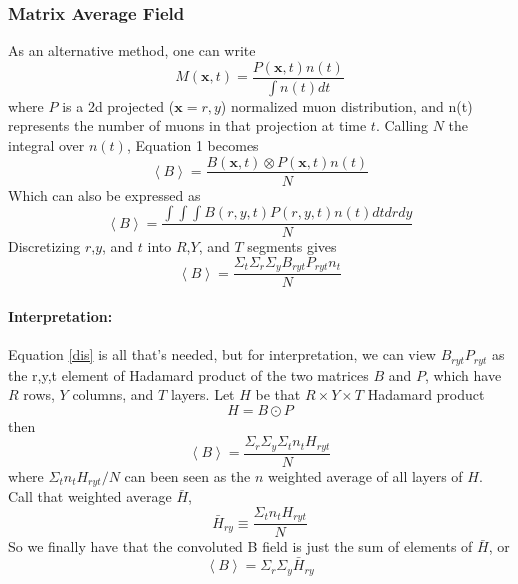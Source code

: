 \documentclass[twoside]{article}
\begin{document}
\subsubsection{Matrix Average Field}
As an alternative method, one can write 
\begin{equation}
M(\textbf{x},t) = \frac{P(\textbf{x},t)n(t)}{\int n(t) dt} 
\end{equation}
where $P$ is a 2d projected ($\textbf{x}=r,y$) normalized muon distribution, and n(t) represents the number of muons in that projection at time $t$. Calling $N$ the integral over $n(t)$,  Equation 1 becomes
\begin{equation}
\left\langle B \right\rangle = \frac{B(\textbf{x},t) \otimes P(\textbf{x},t)n(t)}{N}
\end{equation}
Which can also be expressed as 
\begin{equation}
\left\langle B \right\rangle = \frac{\int \int \int  B(r,y,t) P(r,y,t)n(t)dtdrdy  }  {N}
\end{equation}
Discretizing $r$,$y$, and $t$ into $R$,$Y$, and $T$ segments gives
\begin{equation}
\label{dis}
\boxed{
\left\langle B \right\rangle = \frac{\Sigma_t \Sigma_r \Sigma_y    B_{ryt} P_{ryt}n_t }  {N}
}
\end{equation}

\paragraph{Interpretation:}
Equation \ref{dis}  is all that's needed, but for interpretation, we can view $B_{ryt} P_{ryt}$ as the {r,y,t} element of Hadamard product of the two matrices $B$ and $P$, which have $R$ rows, $Y$ columns, and $T$ layers. Let $H$ be that $R \times Y \times T$  Hadamard product
\begin{equation}
H = B \odot P
\end{equation}
then
\begin{equation}
\left\langle B \right\rangle = \frac{  \Sigma_r \Sigma_y \Sigma_t  n_t  H_{ryt} }  {N}
\end{equation}
where $\Sigma_t  n_t  H_{ryt}/N$ can been seen as the $n$ weighted average of all layers of $H$. Call that weighted average $\bar{H} $,
\begin{equation}
\bar{H}_{ry} \equiv \frac{ \Sigma_t  n_t  H_{ryt} }  {N}
\end{equation}
So we finally have that the convoluted B field is just the sum of elements of $\bar{H}$, or
\begin{equation}
\boxed{
\left\langle B \right\rangle =  \Sigma_r \Sigma_y \bar{H}_{ry}
}
\end{equation}
\end{document}
